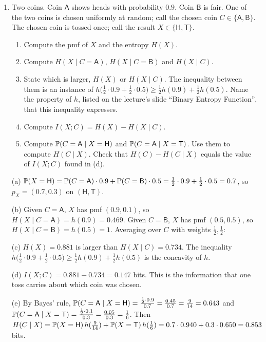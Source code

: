 \begin{enumerate}[resume*=quiz]
\item Two coins. Coin $\mathsf A$ shows heads with probability $0.9$. Coin $\mathsf B$ is fair. One of the two coins is chosen uniformly at random; call the chosen coin $C\in\{\mathsf A,\mathsf B\}$. The chosen coin is tossed once; call the result $X\in\{\mathsf H,\mathsf T\}$.
\begin{enumerate}[label=(\alph*),leftmargin=2em]
\item Compute the pmf of $X$ and the entropy $H(X)$.
\item Compute $H(X\mid C=\mathsf A)$, $H(X\mid C=\mathsf B)$ and $H(X\mid C)$.
\item State which is larger, $H(X)$ or $H(X\mid C)$. The inequality between them is an instance of $h\big(\tfrac12\cdot0.9+\tfrac12\cdot0.5\big)\ge\tfrac12h(0.9)+\tfrac12h(0.5)$. Name the property of $h$, listed on the lecture's slide ``Binary Entropy Function'', that this inequality expresses.
\item Compute $I(X;C)=H(X)-H(X\mid C)$.
\item Compute $\mathbb{P}(C=\mathsf A\mid X=\mathsf H)$ and $\mathbb{P}(C=\mathsf A\mid X=\mathsf T)$. Use them to compute $H(C\mid X)$. Check that $H(C)-H(C\mid X)$ equals the value of $I(X;C)$ found in (d).
\end{enumerate}
\begin{solution}
(a) $\mathbb{P}(X=\mathsf H)=\mathbb{P}(C=\mathsf A)\cdot0.9+\mathbb{P}(C=\mathsf B)\cdot0.5=\tfrac12\cdot0.9+\tfrac12\cdot0.5=0.7$, so $p_X=(0.7,0.3)$ on $(\mathsf H,\mathsf T)$.

(b) Given $C=\mathsf A$, $X$ has pmf $(0.9,0.1)$, so $H(X\mid C=\mathsf A)=h(0.9)=0.469$. Given $C=\mathsf B$, $X$ has pmf $(0.5,0.5)$, so $H(X\mid C=\mathsf B)=h(0.5)=1$. Averaging over $C$ with weights $\tfrac12,\tfrac12$:

(c) $H(X)=0.881$ is larger than $H(X\mid C)=0.734$. The inequality $h\big(\tfrac12\cdot0.9+\tfrac12\cdot0.5\big)\ge\tfrac12h(0.9)+\tfrac12h(0.5)$ is the concavity of $h$.

(d) $I(X;C)=0.881-0.734=0.147$ bits. This is the information that one toss carries about which coin was chosen.

(e) By Bayes' rule, $\mathbb{P}(C=\mathsf A\mid X=\mathsf H)=\frac{\frac12\cdot0.9}{0.7}=\frac{0.45}{0.7}=\tfrac9{14}=0.643$ and $\mathbb{P}(C=\mathsf A\mid X=\mathsf T)=\frac{\frac12\cdot0.1}{0.3}=\frac{0.05}{0.3}=\tfrac16$.
Then $H(C\mid X)=\mathbb{P}(X=\mathsf H)\,h(\tfrac9{14})+\mathbb{P}(X=\mathsf T)\,h(\tfrac16)=0.7\cdot0.940+0.3\cdot0.650=0.853$ bits.
\end{solution}


\end{enumerate}
